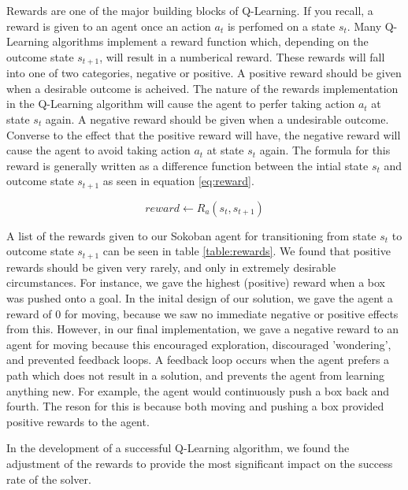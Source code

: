 \documentclass[times, 10pt,twocolumn]{article}
\begin{document}

Rewards are one of the major building blocks of Q-Learning.  If you recall, a reward is given to an agent once an action $a_t$ is perfomed on a state $s_t$.  Many Q-Learning algorithms implement a reward function which, depending on the outcome state $s_{t+1}$, will result in a numberical reward.  These rewards will fall into one of two categories, negative or positive.  A positive reward should be given when a desirable outcome is acheived. The nature of the rewards implementation in the Q-Learning algorithm will cause the agent to perfer taking action $a_t$ at state $s_t$ again.  A negative reward should be given when a undesirable outcome.  Converse to the effect that the positive reward will have, the negative reward will cause the agent to avoid taking action $a_t$ at state $s_t$ again.  The formula for this reward is generally written as a difference function between the intial state $s_t$ and outcome state $s_{t+1}$ as seen in equation \ref{eq:reward}.

\begin{equation}
reward \gets R_a(s_t, s_{t+1})
\label{eq:reward}
\end{equation}

A list of the rewards given to our Sokoban agent for transitioning from state $s_t$ to outcome state $s_{t+1}$ can be seen in table \ref{table:rewards}.  We found that positive rewards should be given very rarely, and only in extremely desirable circumstances.  For instance, we gave the highest (positive) reward when a box was pushed onto a goal.  In the inital design of our solution, we gave the agent a reward of 0 for moving, because we saw no immediate negative or positive effects from this.  However, in our final implementation, we gave a negative reward to an agent for moving because this encouraged exploration, discouraged 'wondering', and prevented feedback loops.  A feedback loop occurs when the agent prefers a path which does not result in a solution, and prevents the agent from learning anything new.  For example, the agent would continuously push a box back and fourth. The reson for this is because both moving and pushing a box provided positive rewards to the agent. 

In the development of a successful Q-Learning algorithm, we found the adjustment of the rewards to provide the most significant impact on the success rate of the solver.
\end{document}
